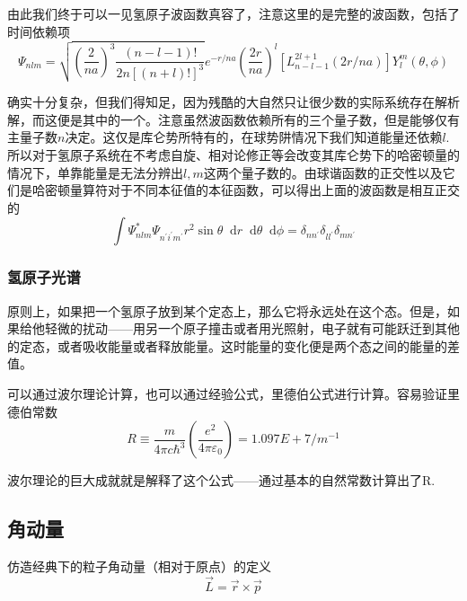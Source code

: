 \documentclass[UTF8]{ctexart}
\newcommand*{\dif}{\mathop{}\!\mathrm{d}}
\begin{document}
    由此我们终于可以一见氢原子波函数真容了，注意这里的是完整的波函数，包括了时间依赖项
    \begin{equation}
        \Psi_{n l m}=\sqrt{\left(\frac{2}{n a}\right)^{3} \frac{(n-l-1) !}{2 n[(n+l) !]^{3}}} e^{-r / n a}\left(\frac{2 r}{n a}\right)^{l}\left[L_{n-l-1}^{2 l+1}(2 r / n a)\right] Y_{l}^{m}(\theta, \phi)
        \end{equation}

\noindent 确实十分复杂，但我们得知足，因为残酷的大自然只让很少数的实际系统存在解析解，而这便是其中的一个。注意虽然波函数依赖所有的三个量子数，但是能够仅有主量子数$n$决定。这仅是库仑势所特有的，在球势阱情况下我们知道能量还依赖$l$. 所以对于氢原子系统在不考虑自旋、相对论修正等会改变其库仑势下的哈密顿量的情况下，单靠能量是无法分辨出$l,m$这两个量子数的。由球谐函数的正交性以及它们是哈密顿量算符对于不同本征值的本征函数，可以得出上面的波函数是相互正交的
\begin{equation}
    \int \Psi_{n l m}^{*} \Psi_{n^{\prime} i^{\prime} m^{\prime}} r^{2} \sin \theta \dif r \dif \theta \dif \phi=\delta_{n n^{\prime}} \delta_{l l^{\prime}} \delta_{m n^{\prime}}
    \end{equation}

    \subsubsection{氢原子光谱}
    原则上，如果把一个氢原子放到某个定态上，那么它将永远处在这个态。但是，如果给他轻微的扰动——用另一个原子撞击或者用光照射，电子就有可能跃迁到其他的定态，或者吸收能量或者释放能量。这时能量的变化便是两个态之间的能量的差值。

    可以通过波尔理论计算，也可以通过经验公式，里德伯公式进行计算。容易验证里德伯常数
    \begin{equation}
        R \equiv \frac{m}{4 \pi c \hbar^3} \left(\frac{e^2}{4 \pi \varepsilon_0}\right) = 1.097E+7/ m^{-1}
    \end{equation}

\noindent 波尔理论的巨大成就就是解释了这个公式——通过基本的自然常数计算出了R.

    \subsection{角动量}
    仿造经典下的粒子角动量（相对于原点）的定义
    \begin{equation}
        \vec{L} = \vec{r} \times \vec{p}
    \end{equation}
\end{document}
